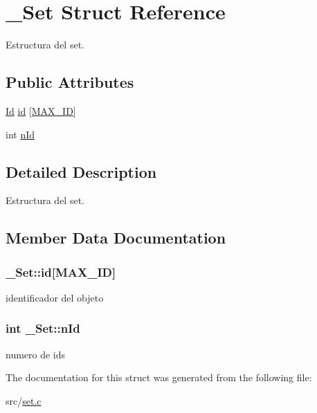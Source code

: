 \hypertarget{struct__Set}{\section{\+\_\+\+Set Struct Reference}
\label{struct__Set}
}


Estructura del set.  


\subsection*{Public Attributes}
\begin{DoxyCompactItemize}
\item 
\hyperlink{types_8h_a845e604fb28f7e3d97549da3448149d3}{Id} \hyperlink{struct__Set_ade7a01e5a10383074adabe6bb75a1e24}{id} \mbox{[}\hyperlink{set_8h_a1cdef4472847c938fc165b7d2737c4e4}{M\+A\+X\+\_\+\+I\+D}\mbox{]}
\item 
int \hyperlink{struct__Set_a42aaa7654deed021016675f5008b15d2}{n\+Id}
\end{DoxyCompactItemize}


\subsection{Detailed Description}
Estructura del set. 

\subsection{Member Data Documentation}
\hypertarget{struct__Set_ade7a01e5a10383074adabe6bb75a1e24}{
\subsubsection[{id}]{ \+\_\+\+Set\+::id\mbox{[}{\bf M\+A\+X\+\_\+\+I\+D}\mbox{]}}}\label{struct__Set_ade7a01e5a10383074adabe6bb75a1e24}
identificador del objeto \hypertarget{struct__Set_a42aaa7654deed021016675f5008b15d2}{
\subsubsection[{n\+Id}]{\setlength{\rightskip}{0pt plus 5cm}int \+\_\+\+Set\+::n\+Id}}\label{struct__Set_a42aaa7654deed021016675f5008b15d2}
numero de ids 

The documentation for this struct was generated from the following file\+:\begin{DoxyCompactItemize}
\item 
src/\hyperlink{set_8c}{set.\+c}\end{DoxyCompactItemize}
